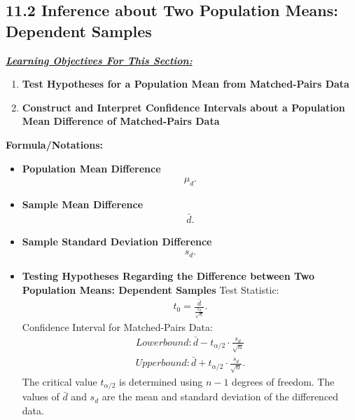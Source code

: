 \documentclass{report}
\begin{document}
    \subsection*{11.2 Inference about Two Population Means: Dependent Samples}
    \bigbreak \noindent 
    \bigbreak \noindent 
    \textbf{\textit{\underline{Learning Objectives For This Section:}}}
    \begin{enumerate}
        \item \textbf{Test Hypotheses for a Population Mean from Matched-Pairs Data}
        \item \textbf{Construct and Interpret Confidence Intervals about a Population Mean Difference of Matched-Pairs Data}
    \end{enumerate}
    \bigbreak \noindent 
    \textbf{Formula/Notations:}
    \begin{itemize}
        \item \textbf{Population Mean Difference}
            \begin{align*}
                \mu_{d}
            .\end{align*}
        \item \textbf{Sample Mean Difference}
            \begin{align*}
                \bar{d}
            .\end{align*}
        \item \textbf{Sample Standard Deviation Difference}
            \begin{align*}
                s_{d}
            .\end{align*}
        \item \textbf{Testing Hypotheses Regarding the Difference between Two Population Means: Dependent Samples}
            \bigbreak \noindent 
            Test Statistic:
            \begin{align*}
                t_{0} = \frac{\bar{d}}{\frac{s_{d}}{\sqrt{n}}}
            .\end{align*}
            \bigbreak \noindent 
            Confidence Interval for Matched-Pairs Data:
            \begin{align*}
                Lower bound: \bar{d} - t_{\alpha/2} \cdot \frac{s_d}{\sqrt{n}} \\
                Upper bound: \bar{d} + t_{\alpha/2} \cdot \frac{s_d}{\sqrt{n}}
            .\end{align*}
            \bigbreak \noindent 
            The critical value $t_{\alpha/2}$ is determined using $n-1$ degrees of freedom. The values of $\bar{d}$ and $s_d$ are the mean and standard deviation of the differenced data.
            \bigbreak \noindent 
            \bigbreak \noindent 
    \end{itemize}
\end{document}
